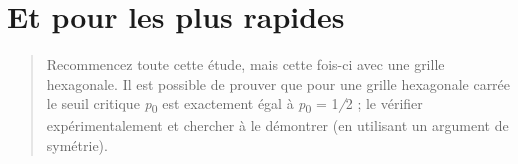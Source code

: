 \documentclass[]{article}
\begin{document}
\section{Et pour les plus rapides}\label{et-pour-les-plus-rapides}

\begin{quote}
Recommencez toute cette étude, mais cette fois-ci avec une grille
hexagonale. Il est possible de prouver que pour une grille hexagonale
carrée le seuil critique \emph{p}\textsubscript{0} est exactement égal à
\emph{p}\textsubscript{0} = 1\emph{/}2 ; le vérifier expérimentalement
et chercher à le démontrer (en utilisant un argument de symétrie).
\end{quote}
\end{document}
